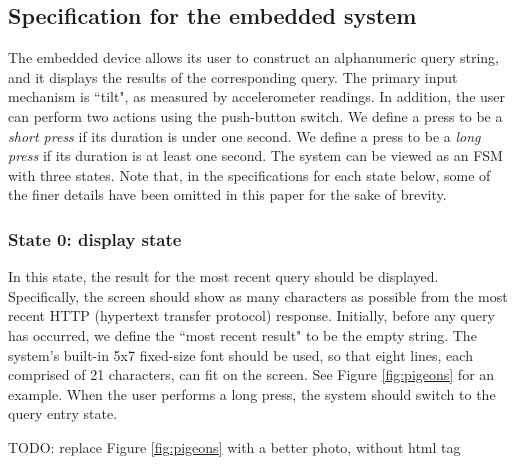 \documentclass[12pt]{article}
\begin{document}
\subsection{Specification for the embedded system}
The embedded device allows its user to construct an alphanumeric query string, and it displays the results of the corresponding query.  The primary input mechanism is ``tilt", as measured by accelerometer readings.  In addition, the user can perform two actions using the push-button switch.  We define a press to be a \textit{short press} if its duration is under one second.  We define a press to be a \textit{long press} if its duration is at least one second.  The system can be viewed as an FSM with three states.  Note that, in the specifications for each state below, some of the finer details have been omitted in this paper for the sake of brevity.

\subsubsection{State 0: display state}
In this state, the result for the most recent query should be displayed.  Specifically, the screen should show as many characters as possible from the most recent HTTP (hypertext transfer protocol) response.  Initially, before any query has occurred, we define the ``most recent result" to be the empty string.  The system's built-in 5x7 fixed-size font should be used, so that eight lines, each comprised of 21 characters, can fit on the screen.  See Figure \ref{fig:pigeons} for an example.  When the user performs a long press, the system should switch to the query entry state.

TODO: replace Figure \ref{fig:pigeons} with a better photo, without html tag
\end{document}
